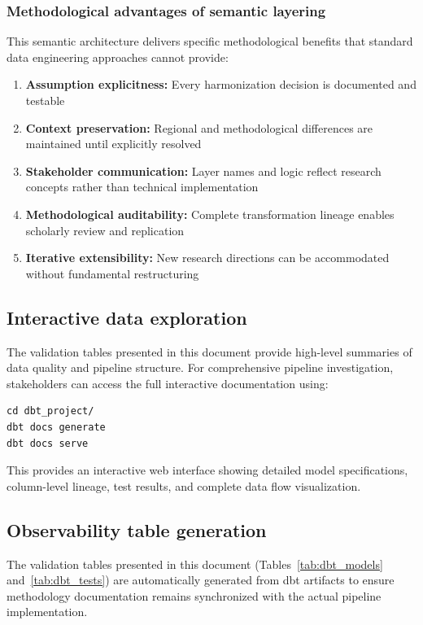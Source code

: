 \documentclass{article}
\begin{document}
\subsubsection{Methodological advantages of semantic layering}

This semantic architecture delivers specific methodological benefits that standard data engineering approaches cannot provide:

\begin{enumerate}
    \item \textbf{Assumption explicitness:} Every harmonization decision is documented and testable
    \item \textbf{Context preservation:} Regional and methodological differences are maintained until explicitly resolved
    \item \textbf{Stakeholder communication:} Layer names and logic reflect research concepts rather than technical implementation
    \item \textbf{Methodological auditability:} Complete transformation lineage enables scholarly review and replication
    \item \textbf{Iterative extensibility:} New research directions can be accommodated without fundamental restructuring
\end{enumerate}

\subsection{Interactive data exploration}

The validation tables presented in this document provide high-level summaries of data quality and pipeline structure. For comprehensive pipeline investigation, stakeholders can access the full interactive documentation using:

\begin{verbatim}
cd dbt_project/
dbt docs generate
dbt docs serve
\end{verbatim}

This provides an interactive web interface showing detailed model specifications, column-level lineage, test results, and complete data flow visualization.

\subsection{Observability table generation}
\label{subsec:obs-table-gen}

The validation tables presented in this document (Tables~\ref{tab:dbt_models} and~\ref{tab:dbt_tests}) are automatically generated from dbt artifacts to ensure methodology documentation remains synchronized with the actual pipeline implementation.
\end{document}
